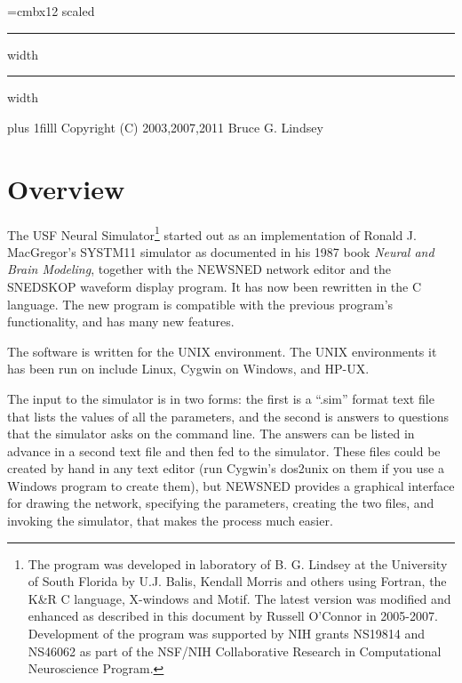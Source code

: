 \documentclass[12pt,openany,oneside]{book}
\newcommand{\ticite}[1]{\textit{#1}}
\begin{document}
{}

\begin{titlepage}
\begingroup
\parindent=0pt
\font\titlefont=cmbx12 scaled 
\vskip4pt \hrule height 4pt width \hsize \vskip4pt
\vskip4pt \hrule height 2pt width \hsize \vskip2pc
\par\vfill
\pagebreak
\thispagestyle{empty}
\vglue 0pt plus 1filll
Copyright (C) 2003,2007,2011 Bruce G. Lindsey
\endgroup
\end{titlepage}

\tableofcontents

\chapter{Overview}

The USF Neural Simulator\footnote{The program was developed in laboratory of
B. G. Lindsey at the University of South Florida by U.J. Balis,
Kendall Morris and others using Fortran, the K\&R C language, X-windows
and Motif. The latest version was modified and enhanced as described
in this document by Russell O'Connor in 2005-2007. Development of the
program was supported by NIH grants NS19814 and NS46062 as part of the
NSF/NIH Collaborative Research in Computational Neuroscience Program.}
started out as an implementation of Ronald J.  MacGregor's SYSTM11
simulator as documented in his 1987 book \ticite{Neural and Brain
Modeling}, together with the NEWSNED network editor and the SNEDSKOP
waveform display program.  It has now been rewritten in the C
language.  The new program is compatible with the previous program's
functionality, and has many new features.

The software is written for the UNIX environment.  The UNIX
environments it has been run on include Linux, Cygwin on Windows, and
HP-UX.

The input to the simulator is in two forms: the first is a ``.sim''
format text file that lists the values of all the parameters, and the
second is answers to questions that the simulator asks on the command
line.  The answers can be listed in advance in a second text file and
then fed to the simulator.  These files could be created by hand in
any text editor (run Cygwin's dos2unix on them if you use a Windows
program to create them), but NEWSNED provides a graphical interface
for drawing the network, specifying the parameters, creating the two
files, and invoking the simulator, that makes the process much easier.
\end{document}
